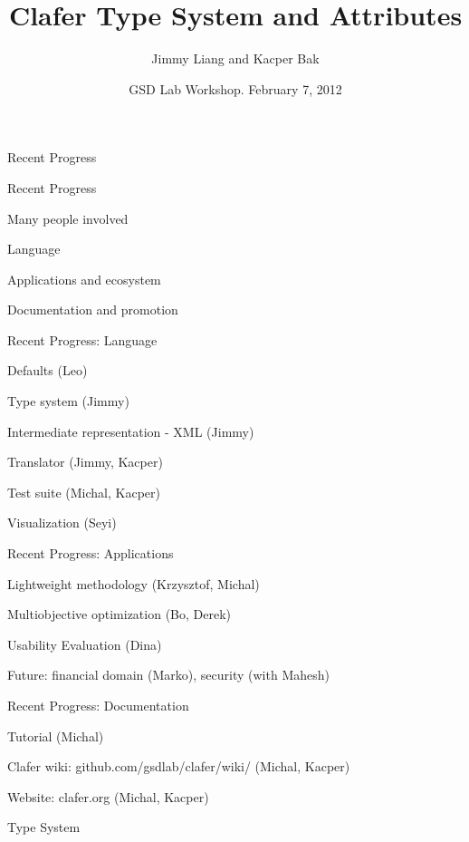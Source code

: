 \documentclass[table,15pt,t]{beamer}
\title{Clafer Type System and Attributes}
\author{Jimmy Liang and Kacper Bak}
\institute{\small Generative Software Development Lab\\University of Waterloo}
\date{GSD Lab Workshop. February 7, 2012}
\newcommand{\vmiddle}[1]{
  \vspace{\stretch{1}}
  #1
  \vspace{\stretch{1}}
}
\newcommand{\interframe}[1]{
\begin{frame}{}
\vmiddle{\hmiddle{\Huge #1}}
\end{frame}
}
\newcommand{\mlist}[1]{
\vmiddle{
  \begin{list}{}{}
    #1
  \end{list}
  }
}
\newcommand{\hmiddle}[1]{
  \begin{center}#1\end{center}
}
\begin{document}
\begin{frame}[plain]
  \vmiddle{\titlepage}
\end{frame}

\interframe{Recent Progress}

\begin{frame}{Recent Progress}
  \mlist{
  \item Many people involved
  \item Language
  \item Applications and ecosystem
  \item Documentation and promotion
  }
\end{frame}

\begin{frame}{Recent Progress: Language}
  \mlist{
  \item Defaults (Leo)
  \item Type system (Jimmy)
  \item Intermediate representation - XML (Jimmy)
  \item Translator (Jimmy, Kacper)
  \item Test suite (Michal, Kacper)
  \item Visualization (Seyi)
  }
\end{frame}

\begin{frame}{Recent Progress: Applications}
  \mlist{
  \item Lightweight methodology (Krzysztof, Michal)
  \item Multiobjective optimization (Bo, Derek)
  \item Usability Evaluation (Dina)
  \item Future: financial domain (Marko), security (with Mahesh)
  }
\end{frame}

\begin{frame}{Recent Progress: Documentation}
  \mlist{
  \item Tutorial (Michal)
  \item Clafer wiki: github.com/gsdlab/clafer/wiki/ (Michal, Kacper)
  \item Website: clafer.org (Michal, Kacper)
  }
\end{frame}

\interframe{Type System}
\end{document}
